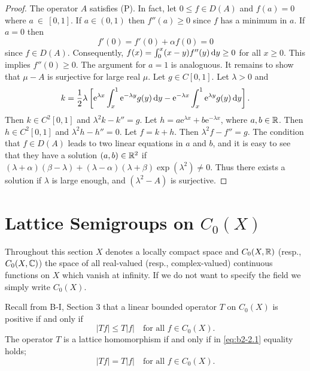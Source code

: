 \begin{proof}
The operator $A$ satisfies (P).
In fact, let $0 \leq f \in D(A)$ and $f(a) = 0$ where $a~\in~[0,1]$.
If $a \in (0,1)$ then $f''(a) \geq 0$ since $f$ has a minimum in $a$.
If $a = 0$ then 
\[
f'(0) = f'(0) + \alpha f(0) = 0
\]
since $f \in D(A)$.
Consequently, $f(x) = \int_{0}^{x} (x-y)f''(y) \mathop{}\!\mathrm{d}{y} \geq 0$ for all $x \geq 0$.
This implies $f''(0) \geq 0$.
The argument for $a = 1$ is analoguous.
It remains to show that $\mu - A$ is surjective for large real $\mu$.
Let $g \in C[0,1]$.
Let $\lambda > 0$ and 
\[k = \frac{1}{2}\lambda\left[\mathrm{e}^{\lambda x}\int_{x}^{1} \mathrm{e}^{-\lambda y}g(y)\mathop{}\!\mathrm{d}{y} - \mathrm{e}^{-\lambda x}\int_{x}^{1} \mathrm{e}^{\lambda y}g(y)\mathop{}\!\mathrm{d}{y}\right].
\]
Then $k \in C^{2}[0,1]$ and $\lambda^{2}k - k'' = g$.
Let $h = a\mathrm{e}^{\lambda x} + b\mathrm{e}^{-\lambda x}$, where $a,b \in \mathbb{R}$.
Then $h \in C^{2}[0,1]$ and $\lambda^{2}h - h'' = 0$.
Let $f = k + h$.
Then $\lambda^{2}f - f'' = g$.
The condition that $f \in D(A)$ leads to two linear equations in $a$ and $b$, and it is easy to see that they have a solution $(a,b) \in \mathbb{R}^{2}$ if $(\lambda+\alpha)(\beta-\lambda) + (\lambda-\alpha)(\lambda+\beta)\exp(\lambda^{2}) \neq 0$.
Thus there exists a solution if $\lambda$ is large enough, and $(\lambda^{2} - A)$ is surjective.
\end{proof}

\section{Lattice Semigroups on  \texorpdfstring{$C_{0}(X)$}{C(X)}}\label{sec:b2-2}%
Throughout this section $X$ denotes a locally compact space and $C_{0}(X,\mathbb{R})$ (resp., $C_{0}(X,\mathbb{C})$) the space of all real-valued (resp., complex-valued) continuous functions on $X$ which vanish at infinity.
If we do not want to specify the field we simply write $C_{0}(X)$.

Recall from B-I, Section 3 that a linear bounded operator $T$ on $C_{0}(X)$ is positive if and only if
\begin{equation}\label{eq:b2-2.1}
|Tf| \leq T|f| \quad \text{for all } f \in C_{0}(X).
\end{equation}
The operator $T$ is a lattice homomorphism if and only if in \eqref{eq:b2-2.1} equality holds; \ie 
\begin{equation}\label{eq:b2-2.2}
|Tf| = T|f| \quad \text{for all } f \in C_{0}(X).
\end{equation}

